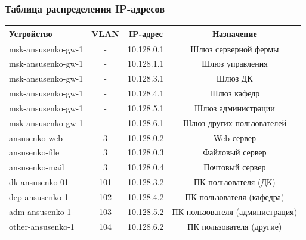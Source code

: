 \begin{frame}
\frametitle{Таблица распределения IP-адресов}
\begin{table}[h]
    \centering
    \tiny
    \begin{tabular}{|p{2.5cm}|c|c|c|}
        \hline
        \textbf{Устройство} & \textbf{VLAN} & \textbf{IP-адрес} & \textbf{Назначение} \\
        \hline
        msk-ansusenko-gw-1 & - & 10.128.0.1 & Шлюз серверной фермы \\
        \hline
        msk-ansusenko-gw-1 & - & 10.128.1.1 & Шлюз управления \\
        \hline
        msk-ansusenko-gw-1 & - & 10.128.3.1 & Шлюз ДК \\
        \hline
        msk-ansusenko-gw-1 & - & 10.128.4.1 & Шлюз кафедр \\
        \hline
        msk-ansusenko-gw-1 & - & 10.128.5.1 & Шлюз администрации \\
        \hline
        msk-ansusenko-gw-1 & - & 10.128.6.1 & Шлюз других пользователей \\
        \hline
        ansusenko-web & 3 & 10.128.0.2 & Web-сервер \\
        \hline
        ansusenko-file & 3 & 10.128.0.3 & Файловый сервер \\
        \hline
        ansusenko-mail & 3 & 10.128.0.4 & Почтовый сервер \\
        \hline
        dk-ansusenko-01 & 101 & 10.128.3.2 & ПК пользователя (ДК) \\
        \hline
        dep-ansusenko-1 & 102 & 10.128.4.2 & ПК пользователя (кафедра) \\
        \hline
        adm-ansusenko-1 & 103 & 10.128.5.2 & ПК пользователя (администрация) \\
        \hline
        other-ansusenko-1 & 104 & 10.128.6.2 & ПК пользователя (другие) \\
        \hline
    \end{tabular}
\end{table}
\end{frame}

